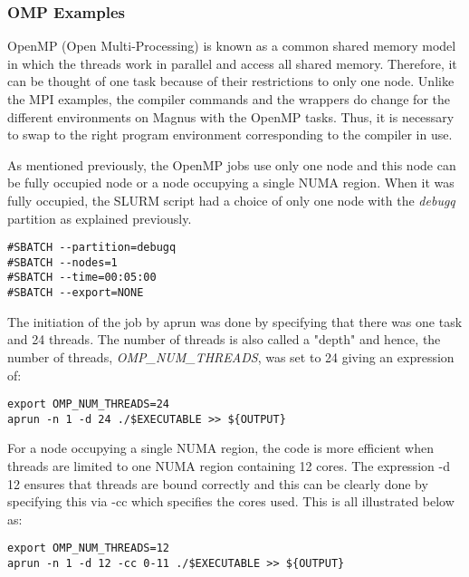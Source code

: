 \subsubsection{OMP Examples}

OpenMP (Open Multi-Processing) is known as a common shared memory model in which the threads work in parallel and access all shared memory. Therefore,
it can be thought of one task because of their restrictions to only one node. Unlike the MPI examples, the compiler commands and the wrappers do change 
for the different environments on Magnus with the OpenMP tasks. Thus, it is necessary to swap to the right program environment corresponding to the 
compiler in use.

As mentioned previously, the OpenMP jobs use only one node and this node can be fully occupied node or a node occupying a single NUMA region. When it was 
fully occupied, the SLURM script had a choice of only one node with the \emph{debugq} partition as explained previously.

\begin{tcolorbox}
\begin{Verbatim}[fontsize=\scriptsize]
#SBATCH --partition=debugq
#SBATCH --nodes=1
#SBATCH --time=00:05:00
#SBATCH --export=NONE
\end{Verbatim}
\end{tcolorbox}

The initiation of the job by aprun was done by specifying that there was one task and 24 threads. The number of threads is also called a "depth" and 
hence, the number of threads, \emph{OMP\_NUM\_THREADS}, was set to 24 giving an expression of:

\begin{tcolorbox}
\begin{Verbatim}[fontsize=\scriptsize]
export OMP_NUM_THREADS=24
aprun -n 1 -d 24 ./$EXECUTABLE >> ${OUTPUT}
\end{Verbatim}
\end{tcolorbox}

For a node occupying a single NUMA region, the code is more efficient when threads are limited to one NUMA region containing 12 cores. The expression 
-d 12 ensures that threads are bound correctly and this can be clearly done by specifying this via -cc which specifies the cores used. This is all 
illustrated below as:

\begin{tcolorbox}
\begin{Verbatim}[fontsize=\scriptsize]
export OMP_NUM_THREADS=12
aprun -n 1 -d 12 -cc 0-11 ./$EXECUTABLE >> ${OUTPUT}
\end{Verbatim}
\end{tcolorbox}

